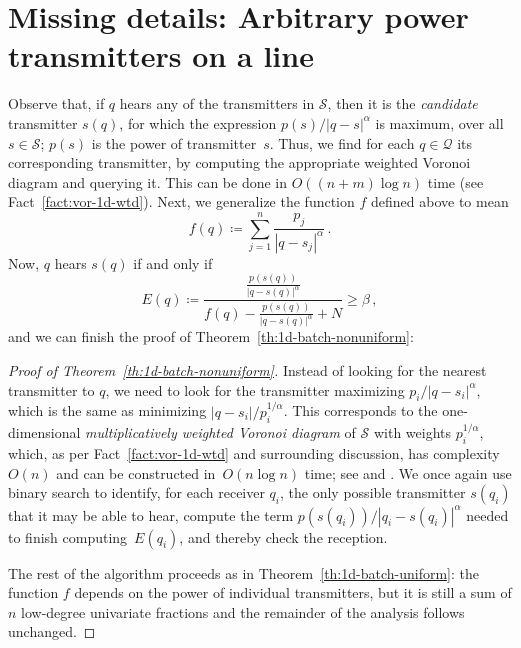 \documentclass[11pt]{article}
\newtheorem{theorem}{Theorem}[section]
\theoremstyle{remark}
\newcommand{\old}[1]{{{}}}
\def\Q{\mathcal{Q}}
\def\S{\mathcal{S}}
\begin{document}
\section{Missing details: Arbitrary power transmitters on a line}
\label{sec:1d-non-uni-details}
Observe that, if $q$ hears any of the transmitters in $\S$, then it is the \emph{candidate} transmitter $s(q)$, for which the expression $p(s)/|q-s|^\alpha$ is maximum, over all~$s \in \S$; $p(s)$ is the power of transmitter~$s$. 
Thus, we find for each $q \in \Q$ its corresponding transmitter, by
computing the appropriate weighted Voronoi diagram and querying it. This can be done in $O((n + m) \log n)$ time (see Fact~\ref{fact:vor-1d-wtd}).  
Next, we generalize the function $f$ defined above to mean
\[
f(q) \coloneqq \sum_{j = 1}^n {\frac{p_j}{|q-s_j|^\alpha}}\, .
\]
Now, $q$ hears $s(q)$ if and only if 
\[
E(q) \coloneqq \frac{\frac{p(s(q))}{|q-s(q)|^\alpha}}{f(q) - \frac{p(s(q))}{|q-s(q)|^\alpha} + N} \geq \beta \, ,
\]
and we can finish the proof of Theorem~\ref{th:1d-batch-nonuniform}:
\old{
\begin{theorem}
  \label{th:1d-batch-nonuniform}
  For any fixed positive even integer $\alpha$, given a set $\S$ of
  transmitters (not necessarily all of the same power) and a set $\Q$
  of receivers, of sizes $n$ and $m$ respectively, we can determine
  which, if any, transmitter is received by each receiver in total
  time $O((n + m) \log^2 n \log \log n)$.
\end{theorem}
}

\begin{proof}[Proof of Theorem~\ref{th:1d-batch-nonuniform}]
  Instead of looking for the nearest transmitter to $q$, we need to
  look for the transmitter maximizing $p_i/|q-s_i|^\alpha$, which is
  the same as minimizing $|q-s_i|/p_i^{1/\alpha}$.  This corresponds to the
  one-dimensional \emph{multiplicatively weighted Voronoi diagram} of
  $\S$ with weights $p_i^{1/\alpha}$, which, as per Fact~\ref{fact:vor-1d-wtd} and surrounding discussion, has complexity $O(n)$ and can be constructed 
  in~$O(n \log n)$ time; see \cite{a-odwvd-86} and
  \cite[Theorem~6.1]{sa-dsstg-95}.  We once again use binary search to
  identify, for each receiver $q_i$, the only possible transmitter
  $s(q_i)$ that it may be able to hear, compute the term
  $p(s(q_i))/|q_i-s(q_i)|^\alpha$ needed to finish computing~$E(q_i)$, and thereby
  check the reception.


  The rest of the algorithm proceeds as in
  Theorem~\ref{th:1d-batch-uniform}: the function $f$ depends on the
  power of individual transmitters, but it is still a sum of $n$
  low-degree univariate fractions and the remainder of the analysis follows unchanged.
\end{proof}
\fi
\end{document}
